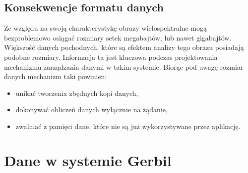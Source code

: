 \subsection{Konsekwencje formatu danych}
Ze względu na swoją charakterystykę obrazy wielospektralne mogą bezproblemowo osiągać rozmiary setek megabajtów, lub nawet gigabajtów. Większość danych pochodnych, które są efektem analizy tego obrazu posiadają podobne rozmiary. Informacja ta jest kluczowa podczas projektowania mechanizmu zarządzania danymi w takim systemie. Biorąc pod uwagę rozmiar danych mechanizm taki powinien:
\begin{itemize}
\item unikać tworzenia zbędnych kopi danych,
\item dokonywać obliczeń danych wyłącznie na żądanie,
\item zwalniać z pamięci dane, które nie są już wykorzystywane przez aplikację.
\end{itemize}

\section{Dane w systemie Gerbil}

